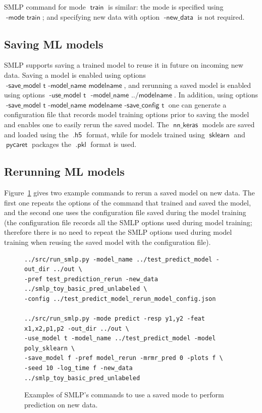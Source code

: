 \documentclass[a4paper,parskip=half]{article} %
\newcommand*\option[1]{\operatorname{\mathsf{#1}}} %
\newcommand*\optionval[2]{\operatorname{\mathsf{#1}\,\,\mathsf{#2}}} %
\newcommand*\suffix[1]{\operatorname{\mathsf{#1}}} %
\newcommand*\mode[1]{\operatorname{\mathsf{#1}}} %
\newcommand*\package[1]{\operatorname{\mathsf{#1}}} %
\begin{document}
SMLP command for mode $\mode{train}$ is similar: the mode is specified using $\optionval{-mode}{train}$;
and specifying new data with option $\option{-new\_data}$ is not required.

\subsection{Saving ML models}\label{sec:models:save}

SMLP supports saving a trained model to reuse it in future on incoming new data. 
Saving a model is enabled using options $\option{-save\_model\,\, t\,\,-model\_name \,\,modelname}$,
and rerunning a saved model is enabled using options $\option{-use\_model\,\, t\ \,\,-model\_name \,\,../modelname}$.
In addition, using options $\option{-save\_model\,\, t\,\,-model\_name \,\,modelname\,\, -save\_config\,\, t}$ 
one can generate a configuration file that records model training options prior to saving the model and  enables one 
to easily rerun the saved model. The $\option{nn\_keras}$ models are saved and loaded using the $\suffix{.h5}$
format, while for models trained using $\package{sklearn}$ and $\package{pycaret}$ packages the  $\option{.pkl}$ format 
 is used. 


\subsection{Rerunning ML models}\label{sec:models:rerun}

Figure~\ref{fig:pred:rerun:saved} gives two example commands to rerun a saved model on new data.
The first one repeats the options of the command that trained and saved the model, and the second
one uses the configuration file saved during the model training (the configuration file records all the SMLP options
used during model training; therefore there is no need to repeat the SMLP options used during model training
when reusing the saved model with the configuration file). 

\begin{figure}%
\begin{verbatim}
../src/run_smlp.py -model_name ../test_predict_model -out_dir ../out \ 
-pref test_prediction_rerun -new_data ../smlp_toy_basic_pred_unlabeled \
-config ../test_predict_model_rerun_model_config.json 

../src/run_smlp.py -mode predict -resp y1,y2 -feat x1,x2,p1,p2 -out_dir ../out \ 
-use_model t -model_name ../test_predict_model -model poly_sklearn \
-save_model f -pref model_rerun -mrmr_pred 0 -plots f \
-seed 10 -log_time f -new_data ../smlp_toy_basic_pred_unlabeled

\end{verbatim}
\caption{Examples of SMLP's commands to use a saved mode to perform prediction on new data.}
\label{fig:pred:rerun:saved}
\end{figure}
\end{document}
